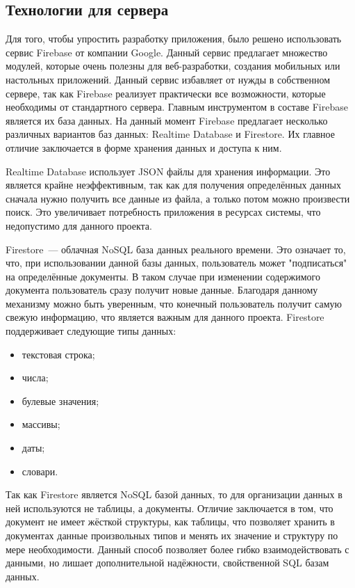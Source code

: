 \subsection{Технологии для сервера}
\label{tech:database}
Для того, чтобы упростить разработку приложения, было решено использовать сервис Firebase от компании Google. Данный сервис предлагает множество модулей, которые очень полезны для веб-разработки, создания мобильных или настольных приложений. Данный сервис избавляет от нужды в собственном сервере, так как Firebase реализует практически все возможности, которые необходимы от стандартного сервера. Главным инструментом в составе Firebase является их база данных. На данный момент Firebase предлагает несколько различных вариантов баз данных: Realtime Database и Firestore. Их главное отличие заключается в форме хранения данных и доступа к ним. 

Realtime Database использует JSON файлы для хранения информации. Это является крайне неэффективным, так как для получения определённых данных сначала нужно получить все данные из файла, а только потом можно произвести поиск. Это увеличивает потребность приложения в ресурсах системы, что недопустимо для данного проекта. 

Firestore~--- облачная NoSQL база данных реального времени. Это означает то, что, при использовании данной базы данных, пользователь может "подписаться" на определённые документы. В таком случае при изменении содержимого документа пользователь сразу получит новые данные. Благодаря данному механизму можно быть уверенным, что конечный пользователь получит самую свежую информацию, что является важным для данного проекта. Firestore поддерживает следующие типы данных:

\begin{itemize}
    \item текстовая строка;
    \item числа;
    \item булевые значения;
    \item массивы;
    \item даты;
    \item словари.
\end{itemize}

Так как Firestore является NoSQL базой данных, то для организации данных в ней используются не таблицы, а документы. Отличие заключается в том, что документ не имеет жёсткой структуры, как таблицы, что позволяет хранить в документах данные произвольных типов и менять их значение и структуру по мере необходимости. Данный способ позволяет более гибко взаимодействовать с данными, но лишает дополнительной надёжности, свойственной SQL базам данных.

